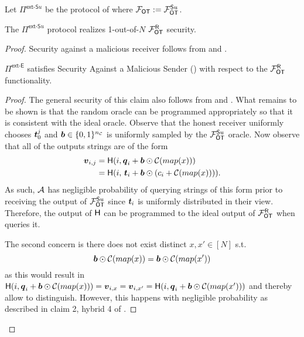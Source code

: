 \begin{definition}\label{def:ext_Su_R}
	Let $\Pi^{\textsf{ext-S}u}$ be the protocol of  where $\OOT:=\OOT^{\send u}$.
\end{definition}
\begin{lemma}\label{lem:ext_Su_R}
	The $\Pi^{\textsf{ext-S}u}$ protocol realizes 1-out-of-$N$ $\OOT^\rec$ security.
\end{lemma}
\begin{proof}
	Security against a malicious receiver follows from  and . 
	
	
	\begin{claim}\label{claim:ext-Su-MalSender}
		$\Pi^\textsf{ext-E}$ satisfies Security Against a Malicious Sender () with respect to the $\OOT^\rec$ functionality.
	\end{claim}
	\begin{proof}
		The general security of this claim also follows from  and . What remains to be shown is that the random oracle can be programmed appropriately so that it is consistent with the ideal oracle. Observe that the honest receiver uniformly chooses $\tt_0^j$ and $\bb\in\{0,1\}^\nc$ is uniformly sampled by the $\OOT^{\send u}$ oracle. Now observe that all of the outputs strings are of the form
		\begin{align*}
			\vv_{i,j}&=\H(i,\qq_i + \bb \odot \mathcal{C}(map(x)))\\
					 &=\H(i,\, \tt_i + \bb \odot (c_i + \mathcal{C}(map(x)))).
		\end{align*}
		As such, $\Adv$ has negligible probability of querying strings of this form prior to receiving the output of $\OOT^{\send u}$ since $\tt_i$ is uniformly distributed in their view. Therefore, the output of $\H$ can be programmed to the ideal output of $\OOT^\rec$ when \Adv queries it.
		
		The second concern is there does not exist distinct $x,x'\in[N]$ s.t. 
		$$
			\bb \odot \mathcal{C}(map(x)) = \bb \odot \mathcal{C}(map(x'))
		$$
		as this would result in $\H(i,\qq_i + \bb \odot \mathcal{C}(map(x)))=\vv_{i,x}=\vv_{i,x'}=\H(i,\qq_i + \bb \odot \mathcal{C}(map(x')))$ and thereby allow \Adv to distinguish. However, this happens with negligible probability as described in claim 2, hybrid 4 of .
		\pe
	\end{proof}
\pe
\end{proof}




